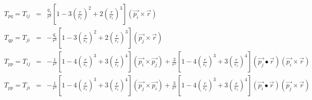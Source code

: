 \documentclass[12pt]{article}
\begin{document}
\begin{eqnarray*}
T_{pq} = T_{ij} & = & \frac{q_j}{r^3}\left[1-3\left(\frac{r}{r_\mathrm{c}}\right)^2+2\left(\frac{r}{r_\mathrm{c}}\right)^3\right] (\vec{p_i} \times \vec{r}) \\
T_{qp} = T_{ji} & = & - \frac{q_i}{r^3}\left[1-3\left(\frac{r}{r_\mathrm{c}}\right)^2+2\left(\frac{r}{r_\mathrm{c}}\right)^3\right] (\vec{p_j} \times \vec{r}) \\
T_{pp} = T_{ij} & = & -\frac{1}{r^3}\left[1-4\left(\frac{r}{r_c}\right)^3+3\left(\frac{r}{r_c}\right)^4\right] (\vec{p_i} \times \vec{p_j}) + 
                      \frac{3}{r^5}\left[1-4\left(\frac{r}{r_c}\right)^3+3\left(\frac{r}{r_c}\right)^4\right] (\vec{p_j} \bullet \vec{r})
		      (\vec{p_i} \times \vec{r}) \\
T_{pp} = T_{ji} & = & -\frac{1}{r^3} \left[1-4\left(\frac{r}{r_c}\right)^3+3\left(\frac{r}{r_c}\right)^4\right](\vec{p_j} \times \vec{p_i}) + 
                      \frac{3}{r^5}\left[1-4\left(\frac{r}{r_c}\right)^3+3\left(\frac{r}{r_c}\right)^4\right] (\vec{p_i} \bullet \vec{r}) 
		      (\vec{p_j} \times \vec{r}) \\
\end{eqnarray*}                           
\end{document}
